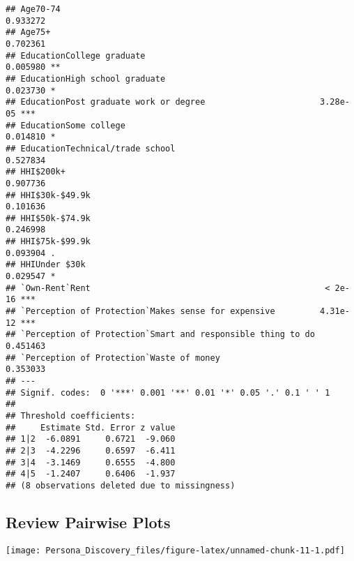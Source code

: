\documentclass[]{article}
\newenvironment{Shaded}{\begin{snugshade}}{\end{snugshade}}
\newcommand{\KeywordTok}[1]{\textcolor[rgb]{0.13,0.29,0.53}{\textbf{{#1}}}}
\newcommand{\DataTypeTok}[1]{\textcolor[rgb]{0.13,0.29,0.53}{{#1}}}
\newcommand{\StringTok}[1]{\textcolor[rgb]{0.31,0.60,0.02}{{#1}}}
\newcommand{\NormalTok}[1]{{#1}}
\begin{document}
\begin{verbatim}
## Age70-74                                                    0.933272    
## Age75+                                                      0.702361    
## EducationCollege graduate                                   0.005980 ** 
## EducationHigh school graduate                               0.023730 *  
## EducationPost graduate work or degree                       3.28e-05 ***
## EducationSome college                                       0.014810 *  
## EducationTechnical/trade school                             0.527834    
## HHI$200k+                                                   0.907736    
## HHI$30k-$49.9k                                              0.101636    
## HHI$50k-$74.9k                                              0.246998    
## HHI$75k-$99.9k                                              0.093904 .  
## HHIUnder $30k                                               0.029547 *  
## `Own-Rent`Rent                                               < 2e-16 ***
## `Perception of Protection`Makes sense for expensive         4.31e-12 ***
## `Perception of Protection`Smart and responsible thing to do 0.451463    
## `Perception of Protection`Waste of money                    0.353033    
## ---
## Signif. codes:  0 '***' 0.001 '**' 0.01 '*' 0.05 '.' 0.1 ' ' 1
## 
## Threshold coefficients:
##     Estimate Std. Error z value
## 1|2  -6.0891     0.6721  -9.060
## 2|3  -4.2296     0.6597  -6.411
## 3|4  -3.1469     0.6555  -4.800
## 4|5  -1.2407     0.6406  -1.937
## (8 observations deleted due to missingness)
\end{verbatim}

\subsection{Review Pairwise Plots}\label{review-pairwise-plots}

\begin{Shaded}
\end{Shaded}

\texttt{[image: Persona\_Discovery\_files/figure-latex/unnamed-chunk-11-1.pdf]}

\begin{Shaded}
\end{Shaded}
\end{document}
